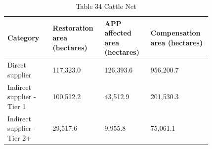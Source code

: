 \documentclass[12pt]{article}
\begin{document}
\begin{table}[H]
\centering
\caption{Table 34 Cattle Net}
{\fontsize{12}{14}\selectfont
\setlength{\tabcolsep}{3pt}
\renewcommand{\arraystretch}{1.08}
\begin{tabular}{p{0.205\linewidth}p{0.205\linewidth}p{0.205\linewidth}p{0.205\linewidth}}
\toprule
Category & Restoration area (hectares) & APP affected area (hectares) & Compensation area (hectares) \\
\midrule
Direct supplier & 117,323.0 & 126,393.6 & 956,200.7 \\
Indirect supplier - Tier 1 & 100,512.2 & 43,512.9 & 201,530.3 \\
Indirect supplier - Tier 2+ & 29,517.6 & 9,955.8 & 75,061.1 \\
\bottomrule
\end{tabular}
}
\end{table}
\end{document}
